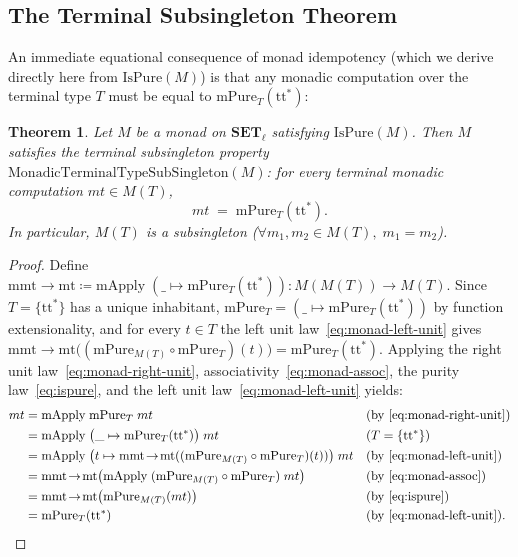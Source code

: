 \documentclass[11pt,a4paper]{article}
\newtheorem{theorem}{Theorem}[section]
\theoremstyle{definition}
\theoremstyle{remark}
\newcommand{\Set}{\mathbf{SET}}
\newcommand{\ttstar}{\mathrm{tt}^*}
\begin{document}
\subsection{The Terminal Subsingleton Theorem}

An immediate equational consequence of monad idempotency (which we derive directly here from
$\mathrm{IsPure}(M)$) is that any monadic computation over the terminal type $T$ must
be equal to $\mathrm{mPure}_T(\ttstar)$:

\begin{theorem}\label{thm:terminal-subsingleton}
Let $M$ be a monad on $\Set_\ell$ satisfying $\mathrm{IsPure}(M)$. Then $M$ satisfies the terminal
subsingleton property $\mathrm{MonadicTerminalTypeSubSingleton}(M)$: for every terminal monadic
computation $mt \in M(T)$,
\begin{equation}\label{eq:terminal-subsingleton}
  mt \;=\; \mathrm{mPure}_T(\ttstar).
\end{equation}
In particular, $M(T)$ is a subsingleton ($\forall m_1, m_2 \in M(T),\; m_1 = m_2$).
\end{theorem}

\begin{proof}
Define $\mathrm{mmt\!\to\!mt} \coloneqq \mathrm{mApply}\;(\_ \mapsto \mathrm{mPure}_T(\ttstar)) : M(M(T)) \to M(T)$.
Since $T = \{\ttstar\}$ has a unique inhabitant, $\mathrm{mPure}_T = (\_ \mapsto \mathrm{mPure}_T(\ttstar))$
by function extensionality, and for every $t \in T$ the left unit law~\eqref{eq:monad-left-unit} gives
$\mathrm{mmt\!\to\!mt}\bigl((\mathrm{mPure}_{M(T)} \circ \mathrm{mPure}_T)(t)\bigr) = \mathrm{mPure}_T(\ttstar)$.
Applying the right unit law~\eqref{eq:monad-right-unit}, associativity~\eqref{eq:monad-assoc}, the
purity law~\eqref{eq:ispure}, and the left unit law~\eqref{eq:monad-left-unit} yields:
\begin{align*}
  mt
  &= \mathrm{mApply}\;\mathrm{mPure}_T\;mt
    &&\text{(by \eqref{eq:monad-right-unit})} \\
  &= \mathrm{mApply}\;\bigl(\_ \mapsto \mathrm{mPure}_T(\ttstar)\bigr)\;mt
    &&\text{($T = \{\ttstar\}$)} \\
  &= \mathrm{mApply}\;\bigl(t \mapsto \mathrm{mmt\!\to\!mt}((\mathrm{mPure}_{M(T)} \circ \mathrm{mPure}_T)(t))\bigr)\;mt
    &&\text{(by \eqref{eq:monad-left-unit})} \\
  &= \mathrm{mmt\!\to\!mt}\bigl(\mathrm{mApply}\;(\mathrm{mPure}_{M(T)} \circ \mathrm{mPure}_T)\;mt\bigr)
    &&\text{(by \eqref{eq:monad-assoc})} \\
  &= \mathrm{mmt\!\to\!mt}\bigl(\mathrm{mPure}_{M(T)}(mt)\bigr)
    &&\text{(by \eqref{eq:ispure})} \\
  &= \mathrm{mPure}_T(\ttstar)
    &&\text{(by \eqref{eq:monad-left-unit})}.
  \qedhere
\end{align*}
\end{proof}
\end{document}
